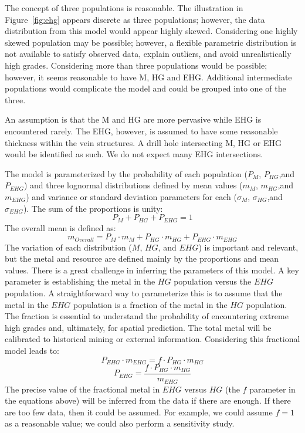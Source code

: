 The concept of three populations is reasonable. The illustration in Figure~\ref{fig:ehg} appears discrete as three populations; however, the data distribution from this model would appear highly skewed. Considering one highly skewed population may be possible; however, a flexible parametric distribution is not available to satisfy observed data, explain outliers, and avoid unrealistically high grades. Considering more than three populations would be possible; however, it seems reasonable to have M, HG and EHG. Additional intermediate populations would complicate the model and could be grouped into one of the three.

An assumption is that the M and HG are more pervasive while EHG is encountered rarely. The EHG, however, is assumed to have some reasonable thickness within the vein structures. A drill hole intersecting M, HG or EHG would be identified as such. We do not expect many EHG intersections.


The model is parameterized by the probability of each population ($P_{M}$, $P_{HG}$,and $P_{EHG}$) and three lognormal distributions defined by mean values ($m_{M}$, $m_{HG}$,and $m_{EHG}$) and variance or standard deviation parameters for each ($\sigma_{M}$, $\sigma_{HG}$,and $\sigma_{EHG}$).  The sum of the proportions is unity:
\[
P_{M} + P_{HG} + P_{EHG}= 1
\]
The overall mean is defined as:
\[
m_{Overall} = P_{M} \cdot m_{M}  + P_{HG} \cdot m_{HG} + P_{EHG} \cdot m_{EHG}
\]
The variation of each distribution ($M$, $HG$, and $EHG$) is important and relevant, but the metal and resource are defined mainly by the proportions and mean values. There is a great challenge in inferring the parameters of this model. A key parameter is establishing the metal in the $HG$ population versus the $EHG$ population. A straightforward way to parameterize this is to assume that the metal in the $EHG$ population is a fraction of the metal in the $HG$ population. The fraction is essential to understand the probability of encountering extreme high grades and, ultimately, for spatial prediction. The total metal will be calibrated to historical mining or external information. Considering this fractional model leads to:
\[
P_{EHG} \cdot m_{EHG} = f \cdot P_{HG} \cdot m_{HG}
\]
\[
P_{EHG} = \frac{f \cdot P_{HG} \cdot m_{HG}}{m_{EHG}}
\]
The precise value of the fractional metal in $EHG$ versus $HG$ (the $f$ parameter in the equations above) will be inferred from the data if there are enough. If there are too few data, then it could be assumed. For example, we could assume $f=1$ as a reasonable value; we could also perform a sensitivity study.

